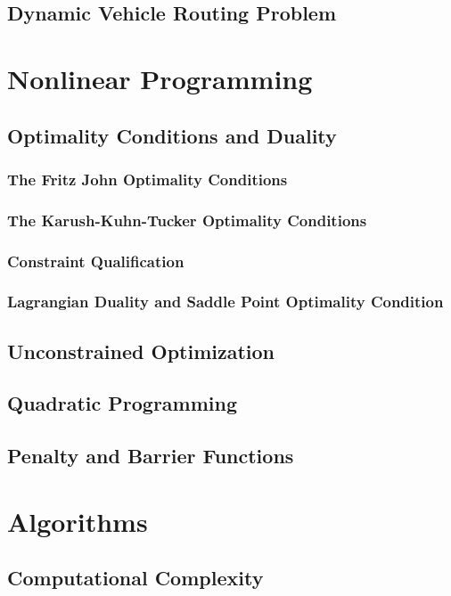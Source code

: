 		\chapter{Dynamic Vehicle Routing Problem}

	\part{Nonlinear Programming}\label{Nonlinear}
		\chapter{Optimality Conditions and Duality}
			\section{The Fritz John Optimality Conditions}

			\section{The Karush-Kuhn-Tucker Optimality Conditions}

			\section{Constraint Qualification}

			\section{Lagrangian Duality and Saddle Point Optimality Condition}

		\chapter{Unconstrained Optimization}

		\chapter{Quadratic Programming}

		\chapter{Penalty and Barrier Functions}

	\part{Algorithms}\label{Algo}
		\chapter{Computational Complexity}
